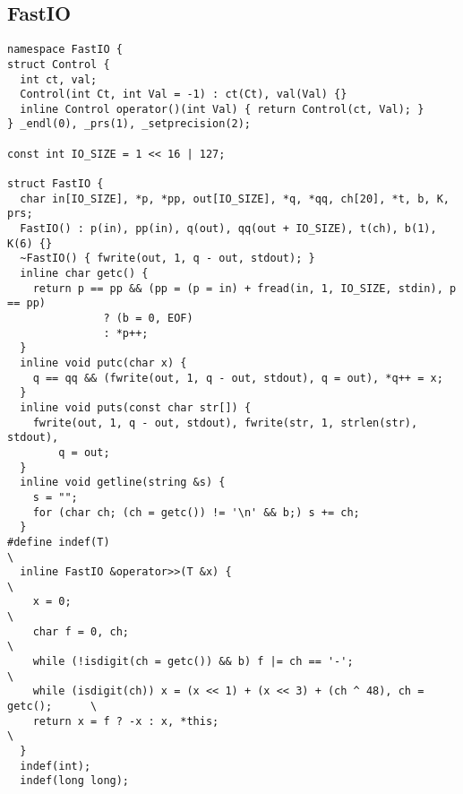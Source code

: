 \documentclass[twoside]{article}
\begin{document}
\subsection{FastIO}
\begin{lstlisting}
namespace FastIO {
struct Control {
  int ct, val;
  Control(int Ct, int Val = -1) : ct(Ct), val(Val) {}
  inline Control operator()(int Val) { return Control(ct, Val); }
} _endl(0), _prs(1), _setprecision(2);

const int IO_SIZE = 1 << 16 | 127;

struct FastIO {
  char in[IO_SIZE], *p, *pp, out[IO_SIZE], *q, *qq, ch[20], *t, b, K, prs;
  FastIO() : p(in), pp(in), q(out), qq(out + IO_SIZE), t(ch), b(1), K(6) {}
  ~FastIO() { fwrite(out, 1, q - out, stdout); }
  inline char getc() {
    return p == pp && (pp = (p = in) + fread(in, 1, IO_SIZE, stdin), p == pp)
               ? (b = 0, EOF)
               : *p++;
  }
  inline void putc(char x) {
    q == qq && (fwrite(out, 1, q - out, stdout), q = out), *q++ = x;
  }
  inline void puts(const char str[]) {
    fwrite(out, 1, q - out, stdout), fwrite(str, 1, strlen(str), stdout),
        q = out;
  }
  inline void getline(string &s) {
    s = "";
    for (char ch; (ch = getc()) != '\n' && b;) s += ch;
  }
#define indef(T)                                                               \
  inline FastIO &operator>>(T &x) {                                            \
    x = 0;                                                                     \
    char f = 0, ch;                                                            \
    while (!isdigit(ch = getc()) && b) f |= ch == '-';                         \
    while (isdigit(ch)) x = (x << 1) + (x << 3) + (ch ^ 48), ch = getc();      \
    return x = f ? -x : x, *this;                                              \
  }
  indef(int);
  indef(long long);


\end{lstlisting}
\end{document}

